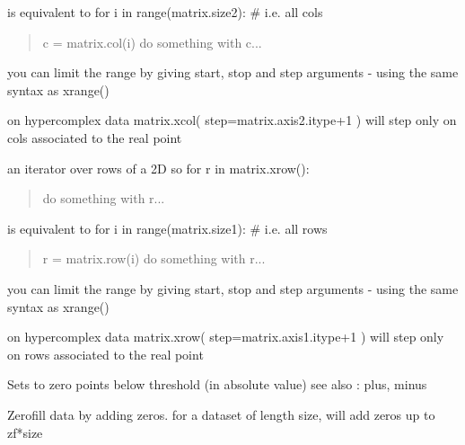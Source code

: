\documentclass[letterpaper,10pt,openany,oneside]{sphinxmanual}
\begin{document}
\begin{fulllineitems}
\begin{fulllineitems}
is equivalent to
for i in range(matrix.size2):     \# i.e. all cols
\begin{quote}

c = matrix.col(i)
do something with c...
\end{quote}

you can limit the range by giving start, stop and step arguments - using the same syntax as xrange()

on hypercomplex data
matrix.xcol( step=matrix.axis2.itype+1 )
will step only on cols associated to the real point

\end{fulllineitems}


\begin{fulllineitems}
\label{rst/code:NPKData.NPKData.xrow}
an iterator over rows of a 2D
so 
for r in matrix.xrow():
\begin{quote}

do something with r...
\end{quote}

is equivalent to
for i in range(matrix.size1):     \# i.e. all rows
\begin{quote}

r = matrix.row(i)
do something with r...
\end{quote}

you can limit the range by giving start, stop and step arguments - using the same syntax as xrange()

on hypercomplex data
matrix.xrow( step=matrix.axis1.itype+1 )
will step only on rows associated to the real point

\end{fulllineitems}


\begin{fulllineitems}
\label{rst/code:NPKData.NPKData.zeroing}
Sets to zero points below threshold (in absolute value)
see also :  plus, minus

\end{fulllineitems}


\begin{fulllineitems}
\label{rst/code:NPKData.NPKData.zf}
Zerofill data by adding zeros.
for a dataset of length size, will add zeros up to zf*size


\end{fulllineitems}
\end{fulllineitems}
\end{document}
